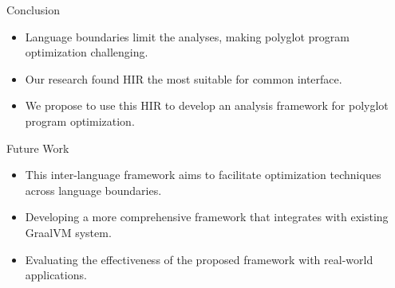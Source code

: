 \begin{frame}
    \centering
    \textbf{}
\end{frame}

\begin{frame}{Conclusion}
    \begin{itemize}
        \item Language boundaries limit the analyses, making polyglot program optimization challenging.
        \vspace{2mm}
        \item Our research found HIR the most suitable for common interface.
        \vspace{2mm}
        \item We propose to use this HIR to develop an analysis framework for polyglot program optimization.
    \end{itemize}
\end{frame}

\begin{frame}{Future Work}
    \begin{itemize}
        \item This inter-language framework aims to facilitate optimization techniques across language boundaries.
        \vspace{2mm}
        \item Developing a more comprehensive framework that integrates with existing GraalVM system.
        \vspace{2mm}
        \item Evaluating the effectiveness of the proposed framework with real-world applications.
    \end{itemize}
\end{frame}
